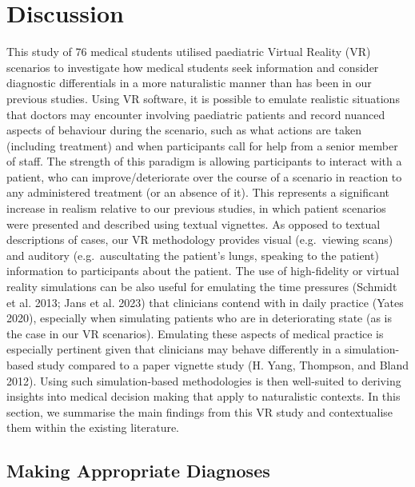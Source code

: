 \documentclass[a4paper, nobind]{templates/ociamthesis}
\begin{document}
\section{Discussion}\label{discussion}

This study of 76 medical students utilised paediatric Virtual Reality (VR) scenarios to investigate how medical students seek information and consider diagnostic differentials in a more naturalistic manner than has been in our previous studies. Using VR software, it is possible to emulate realistic situations that doctors may encounter involving paediatric patients and record nuanced aspects of behaviour during the scenario, such as what actions are taken (including treatment) and when participants call for help from a senior member of staff. The strength of this paradigm is allowing participants to interact with a patient, who can improve/deteriorate over the course of a scenario in reaction to any administered treatment (or an absence of it). This represents a significant increase in realism relative to our previous studies, in which patient scenarios were presented and described using textual vignettes. As opposed to textual descriptions of cases, our VR methodology provides visual (e.g.~viewing scans) and auditory (e.g.~auscultating the patient's lungs, speaking to the patient) information to participants about the patient. The use of high-fidelity or virtual reality simulations can be also useful for emulating the time pressures (Schmidt et al. 2013; Jans et al. 2023) that clinicians contend with in daily practice (Yates 2020), especially when simulating patients who are in deteriorating state (as is the case in our VR scenarios). Emulating these aspects of medical practice is especially pertinent given that clinicians may behave differently in a simulation-based study compared to a paper vignette study (H. Yang, Thompson, and Bland 2012). Using such simulation-based methodologies is then well-suited to deriving insights into medical decision making that apply to naturalistic contexts. In this section, we summarise the main findings from this VR study and contextualise them within the existing literature.

\subsection{Making Appropriate Diagnoses}\label{making-appropriate-diagnoses}
\end{document}
